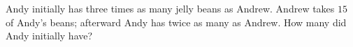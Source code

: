 Andy initially has three times as many jelly beans as Andrew. Andrew takes $15$ of Andy's beans; afterward Andy has twice as many as Andrew. How many did Andy initially have?
